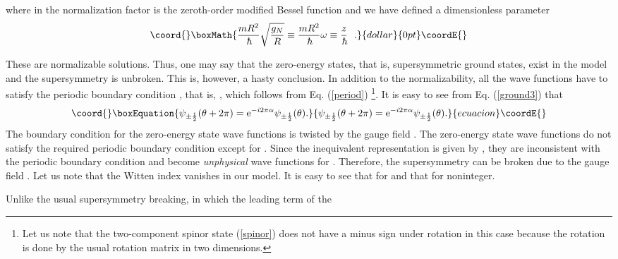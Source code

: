 \documentclass[a4paper,12pt]{article}
\begin{document}
where \coordHE{} in the normalization factor is the zeroth-order modified
Bessel function and we have defined a dimensionless parameter
$$\coord{}\boxMath{
{{mR^2}\over \hbar}\sqrt{{g_N\over R}}
\equiv {mR^2\over \hbar}\omega
\equiv {z\over {\hbar}}~~.
}{dollar}{0pt}\coordE{}$$
\par
These are normalizable solutions. Thus, one may 
say that the zero-energy states, that is, supersymmetric ground 
states, exist in the model and the supersymmetry is unbroken. 
This is, however, a hasty conclusion. 
In addition to the normalizability, all the wave functions 
have to satisfy the periodic boundary condition
\myHighlight{$\Psi(\theta+2\pi)=\Psi(\theta)$}\coordHE{}, that is, \myHighlight{$\psi_{\pm \half}(\theta+2\pi)
=\psi_{\pm \half}(\theta)$}\coordHE{}, which follows 
from Eq. (\ref{period}) \footnote{Let us note that the two-component spinor 
state (\ref{spinor}) does not have a minus  
sign under \myHighlight{$2\pi$}\coordHE{} rotation in this case because the 
rotation is done by the usual rotation matrix in two dimensions.}. 
It is easy to see from Eq. (\ref{ground3}) that
\begin{equation}\coord{}\boxEquation{
\psi_{\pm \half}(\theta+2\pi)=\e^{-i2\pi\alpha}\psi_{\pm \half}(\theta).
\label{boundary}
}{
\psi_{\pm \half}(\theta+2\pi)=\e^{-i2\pi\alpha}\psi_{\pm \half}(\theta).
}{ecuacion}\coordE{}\end{equation}
The boundary condition for the zero-energy state 
wave functions is 
twisted by the gauge field \myHighlight{$\alpha$}\coordHE{}.  
The zero-energy state wave functions do not satisfy the required periodic 
boundary condition except for \coordHE{}. Since the inequivalent
representation is given by \coordHE{}, they 
are inconsistent with the periodic boundary condition and become 
{\it unphysical} wave functions for \coordHE{}.
Therefore, the supersymmetry can be broken due to the 
gauge field \myHighlight{$\alpha$}\coordHE{}. Let us note that the 
Witten index \coordHE{} vanishes 
in our model.  
It is easy to see that \coordHE{} for \coordHE{}
and that \coordHE{} for \myHighlight{$\alpha=$}\coordHE{} noninteger.
\par
Unlike the usual supersymmetry breaking, in which the leading term of the
\end{document}
